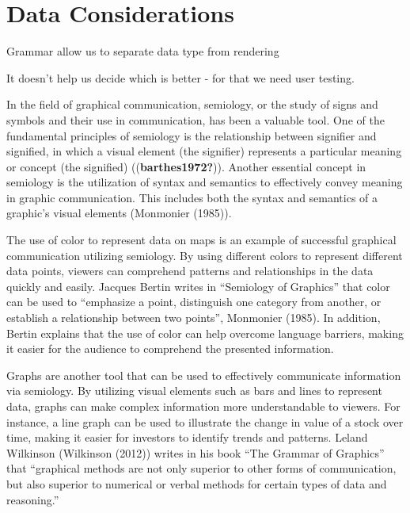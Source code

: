 \documentclass[print]{nuthesis}
\begin{document}

\hypertarget{data-considerations}{%
\section{Data Considerations}\label{data-considerations}}

Grammar allow us to separate data type from rendering


It doesn't help us decide which is better - for that we need user testing.

In the field of graphical communication, semiology, or the study of signs and symbols and their use in communication, has been a valuable tool.
One of the fundamental principles of semiology is the relationship between signifier and signified, in which a visual element (the signifier) represents a particular meaning or concept (the signified) ((\textbf{barthes1972?})).
Another essential concept in semiology is the utilization of syntax and semantics to effectively convey meaning in graphic communication.
This includes both the syntax and semantics of a graphic's visual elements (Monmonier (1985)).

The use of color to represent data on maps is an example of successful graphical communication utilizing semiology.
By using different colors to represent different data points, viewers can comprehend patterns and relationships in the data quickly and easily.
Jacques Bertin writes in ``Semiology of Graphics'' that color can be used to ``emphasize a point, distinguish one category from another, or establish a relationship between two points'', Monmonier (1985).
In addition, Bertin explains that the use of color can help overcome language barriers, making it easier for the audience to comprehend the presented information.

Graphs are another tool that can be used to effectively communicate information via semiology.
By utilizing visual elements such as bars and lines to represent data, graphs can make complex information more understandable to viewers.
For instance, a line graph can be used to illustrate the change in value of a stock over time, making it easier for investors to identify trends and patterns. Leland Wilkinson (Wilkinson (2012)) writes in his book ``The Grammar of Graphics'' that ``graphical methods are not only superior to other forms of communication, but also superior to numerical or verbal methods for certain types of data and reasoning.''
\end{document}
